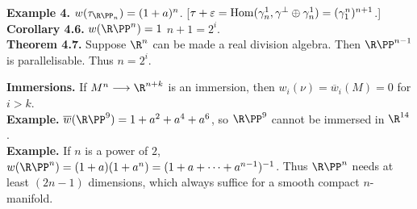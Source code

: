 \documentclass[11pt]{article}
\begin{document}
\begin{itemise}
\textbf{Example 4.} $w(\tau_{\RP_n})=(1+a)^n$. [$\tau+\varepsilon=\operatorname{Hom}(\gamma^1_n,\gamma^\perp\oplus\gamma_n^1)=(\gamma_1^n)^{n+1}$.]\\
\textbf{Corollary 4.6.} $w(\RP^n)=1$ \Iff $n+1=2^i$.\\
\textbf{Theorem 4.7.} Suppose $\R^n$ can be made a real division algebra. Then $\RP^{n-1}$ is parallelisable. Thus $n=2^i$.
\item \textbf{Immersions.} If $M^n\to\R^{n+k}$ is an immersion, then $w_i(\nu)=\overline{w}_i(M)=0$ for $i>k$.\\
\textbf{Example.} $\overline w(\RP^9)=1+a^2+a^4+a^6$, so $\RP^9$ cannot be immersed in $\R^{14}$.\\
\textbf{Example.} If $n$ is a power of $2$, $w(\RP^n)=(1+a)(1+a^n)=(1+a+\cdots+a^{n-1})^{-1}$. Thus $\RP^n$ needs at least $(2n-1)$ dimensions, which always suffice for a smooth compact $n$-manifold.
\end{itemise}
\end{document}
